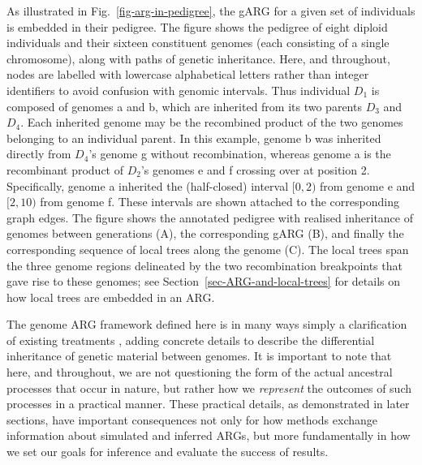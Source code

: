 \documentclass{article}
\newcommand{\noderef}[1]{\textsf{#1}}
\begin{document}
As illustrated in Fig.~\ref{fig-arg-in-pedigree},
the gARG for a given set of individuals is embedded in their pedigree.
The figure shows the pedigree of eight diploid individuals
and their sixteen constituent genomes (each consisting of a single chromosome),
along with paths of genetic inheritance.
Here, and throughout,
nodes are labelled with lowercase alphabetical letters
rather than integer identifiers to avoid confusion with genomic intervals.
Thus individual $D_1$ is composed
of genomes \noderef{a} and \noderef{b}, which are inherited from its
two parents $D_3$ and $D_4$. Each inherited genome may be the recombined product
of the two genomes belonging to an individual parent.
In this example,
genome \noderef{b} was inherited directly from $D_4$'s genome \noderef{g} without
recombination, whereas
genome \noderef{a} is the recombinant product of
$D_2$'s genomes \noderef{e} and \noderef{f} crossing over at position 2.
Specifically, genome \noderef{a} inherited the (half-closed)
interval $[0, 2)$ from genome \noderef{e} and $[2, 10)$ from genome \noderef{f}.
These intervals are shown attached to the corresponding graph edges.
The figure shows the annotated pedigree with realised inheritance of genomes
between generations (A), the corresponding gARG (B), and finally the corresponding
sequence of local trees along the
genome (C).
The local trees span the three genome regions delineated
by the two recombination breakpoints that gave rise to these genomes;
see Section~\ref{sec-ARG-and-local-trees} for details
on how local trees are embedded in an ARG.

The genome ARG framework defined here is
in many ways simply a clarification of existing treatments
\cite[e.g.][]{mathieson2020ancestry,shipilina2023origin},
adding concrete details to describe the
differential inheritance of genetic material between genomes.
It is important to note that here, and throughout,
we are not questioning the form of the
actual ancestral processes that occur in nature, but rather how we
\emph{represent} the outcomes of such processes in a practical manner.
These practical details,
as demonstrated in later sections, have important
consequences not only for how methods exchange information about
simulated and inferred ARGs, but more fundamentally in
how we set our goals for inference and evaluate the success of results.
\end{document}
